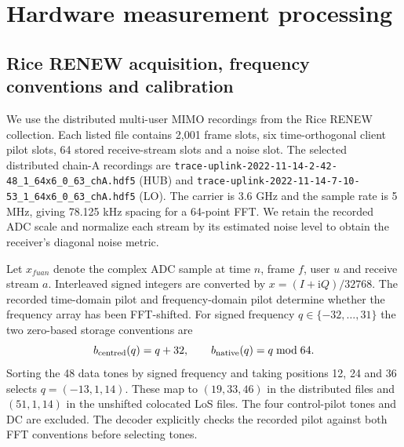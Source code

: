 \documentclass[10pt,letterpaper]{article}
\begin{document}
\section{Hardware measurement processing}
\label{supp:note6}

\subsection*{Rice RENEW acquisition, frequency conventions and calibration}
We use the distributed multi-user MIMO recordings from the Rice RENEW collection.
Each listed file contains 2,001 frame slots, six time-orthogonal client pilot slots,
64 stored receive-stream slots and a noise slot. The selected distributed chain-A
recordings are \texttt{trace-uplink-2022-11-14-2-42-48\_1\_64x6\_0\_63\_chA.hdf5}
(HUB) and \texttt{trace-uplink-2022-11-14-7-10-53\_1\_64x6\_0\_63\_chA.hdf5}
(LO). The carrier is 3.6 GHz and the sample rate is 5 MHz, giving 78.125 kHz
spacing for a 64-point FFT. We retain the recorded ADC scale and normalize each stream by its estimated noise level to obtain the receiver's diagonal noise metric.

Let $x_{fuan}$ denote the complex ADC sample at time $n$, frame $f$, user $u$
and receive stream $a$. Interleaved signed integers are converted by
$x=(I+\mathrm{i}Q)/32768$. The recorded time-domain pilot and frequency-domain
pilot determine whether the frequency array has been FFT-shifted. For signed
frequency $q\in\{-32,\ldots,31\}$ the two zero-based storage conventions are
\begin{equation}
 b_{\rm centred}(q)=q+32,\qquad b_{\rm native}(q)=q\bmod64.
\end{equation}
Sorting the 48 data tones by signed frequency and taking positions 12, 24 and
36 selects $q=(-13,1,14)$. These map to $(19,33,46)$ in the distributed files
and $(51,1,14)$ in the unshifted colocated LoS files. The four control-pilot
tones and DC are excluded. The decoder explicitly checks the recorded pilot
against both FFT conventions before selecting tones.
\end{document}
